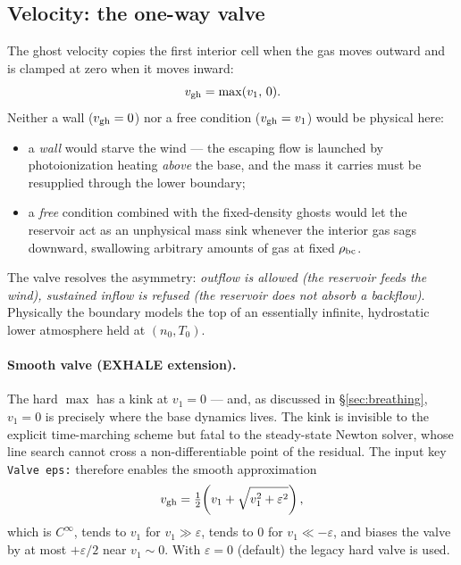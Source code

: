\documentclass[english,a4paper]{kiseon_memo}
\begin{document}
\subsection{Velocity: the one-way valve}
\label{sec:valve}

The ghost velocity copies the first interior cell when the gas moves
outward and is clamped at zero when it moves inward:
\begin{equation}
v_{\rm gh} = \max(v_1,\, 0).
\end{equation}
Neither a wall ($v_{\rm gh}=0$) nor a free condition
($v_{\rm gh}=v_1$) would be physical here:
\begin{itemize}
\item a \emph{wall} would starve the wind --- the escaping flow is
  launched by photoionization heating \emph{above} the base, and the
  mass it carries must be resupplied through the lower boundary;
\item a \emph{free} condition combined with the fixed-density ghosts
  would let the reservoir act as an unphysical mass sink whenever the
  interior gas sags downward, swallowing arbitrary amounts of gas at
  fixed $\rho_{\rm bc}$.
\end{itemize}
The valve resolves the asymmetry: \emph{outflow is allowed (the
reservoir feeds the wind), sustained inflow is refused (the reservoir
does not absorb a backflow)}. Physically the boundary models the top
of an essentially infinite, hydrostatic lower atmosphere held at
$(n_0, T_0)$.

\paragraph{Smooth valve (EXHALE extension).}
The hard $\max$ has a kink at $v_1 = 0$ --- and, as discussed in
\S\ref{sec:breathing}, $v_1 = 0$ is precisely where the base
dynamics lives. The kink is invisible to the explicit time-marching
scheme but fatal to the steady-state Newton solver, whose line search
cannot cross a non-differentiable point of the residual. The input
key \texttt{Valve eps:} therefore enables the smooth approximation
\begin{equation}
v_{\rm gh} = \tfrac12\!\left( v_1 + \sqrt{v_1^2 + \varepsilon^2} \right),
\end{equation}
which is $C^\infty$, tends to $v_1$ for $v_1 \gg \varepsilon$, tends
to $0$ for $v_1 \ll -\varepsilon$, and biases the valve by at most
$+\varepsilon/2$ near $v_1 \sim 0$. With
$\varepsilon = 0$ (default) the legacy hard valve is used.
\end{document}
